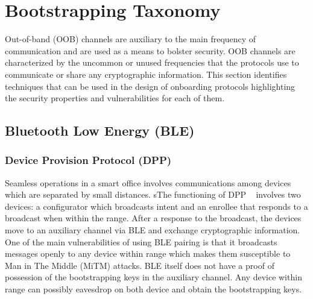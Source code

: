 \section{Bootstrapping Taxonomy}

Out-of-band (OOB) channels are auxiliary to the main frequency of communication and are used as a means to bolster security.
OOB channels are characterized by the uncommon or unused frequencies that the protocols use to communicate or share any cryptographic information.
This section identifies techniques that can be used in the design of onboarding protocols highlighting the security properties and vulnerabilities for each of them. 

\subsection{Bluetooth Low Energy (BLE)}
\subsubsection{Device Provision Protocol (DPP)}
Seamless operations in a smart office involves communications among devices which are separated by small distances.
sThe functioning of DPP ~\cite{wifialliance} involves two devices: a configurator which broadcasts intent and an enrollee that responds to a broadcast when within the range.
After a response to the broadcast, the devices move to an auxiliary channel via BLE and exchange cryptographic information.
One of the main vulnerabilities of using BLE pairing is that it broadcasts messages openly to any device within range which makes them susceptible to Man in The Middle (MiTM) attacks.
BLE itself does not have a proof of possession of the bootstrapping keys in the auxiliary channel.
Any device within range can possibly eavesdrop on both device and obtain the bootstrapping keys.




